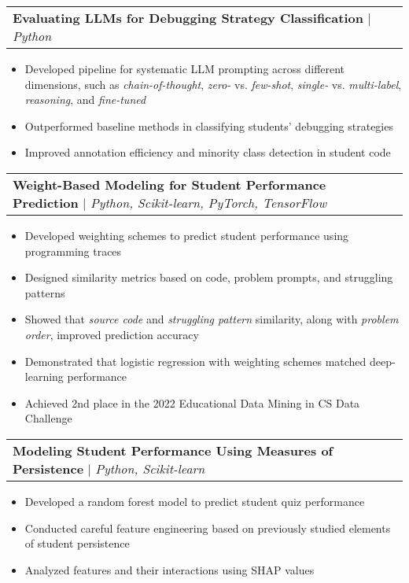 \documentclass[letterpaper,11pt]{article}
\makeatletter
\newcommand{\resumeItem}[1]{
  \item\small{
    {#1 \vspace{-2pt}}
  }
}
\newcommand{\resumeProjectHeading}[2]{
    \item
    \begin{tabular*}{0.97\textwidth}{l@{\extracolsep{\fill}}r}
      \small#1 & #2 \\
    \end{tabular*}\vspace{-7pt}
}
\newcommand{\resumeItemListStart}{\begin{itemize}}
\newcommand{\resumeItemListEnd}{\end{itemize}\vspace{-5pt}}
\makeatother
\begin{document}
      \resumeProjectHeading
          {\textbf{Evaluating LLMs for Debugging Strategy Classification} $|$ \emph{Python}}{}
          \resumeItemListStart
            \resumeItem{Developed pipeline for systematic LLM prompting across different dimensions, such as \emph{chain-of-thought}, \emph{zero-} vs. \emph{few-shot}, \emph{single-} vs. \emph{multi-label}, \emph{reasoning}, and \emph{fine-tuned}}
            \resumeItem{Outperformed baseline methods in classifying students' debugging strategies}
            \resumeItem{Improved annotation efficiency and minority class detection in student code}
          \resumeItemListEnd

      \resumeProjectHeading
          {\textbf{Weight-Based Modeling for Student Performance Prediction} $|$ \emph{Python, Scikit-learn, PyTorch, TensorFlow}}{}
          \resumeItemListStart
            \resumeItem{Developed weighting schemes to predict student performance using programming traces}
            \resumeItem{Designed similarity metrics based on code, problem prompts, and struggling patterns}
            \resumeItem{Showed that \emph{source code} and \emph{struggling pattern} similarity, along with \emph{problem order}, improved prediction accuracy}
            \resumeItem{Demonstrated that logistic regression with weighting schemes matched deep-learning performance}
            \resumeItem{Achieved 2nd place in the 2022 Educational Data Mining in CS Data Challenge}
          \resumeItemListEnd

      \resumeProjectHeading
          {\textbf{Modeling Student Performance Using Measures of Persistence} $|$ \emph{Python, Scikit-learn}}{}%
          \resumeItemListStart
            \resumeItem{Developed a random forest model to predict student quiz performance}
            \resumeItem{Conducted careful feature engineering based on previously studied elements of student persistence}
            \resumeItem{Analyzed features and their interactions using SHAP values}
          \resumeItemListEnd
\end{document}

